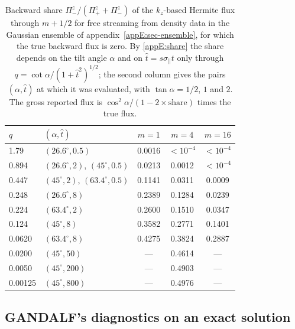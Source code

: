 \begin{table}[t]
  \centering
  \caption{Backward share $\Pi^z_-/(\Pi^z_++\Pi^z_-)$ of the $k_z$-based Hermite flux through $m+1/2$ for free streaming from density data in the Gaussian ensemble of appendix~\ref{appE:sec-ensemble}, for which the true backward flux is zero. By \eqref{appE:share} the share depends on the tilt angle $\alpha$ and on $\hat t=s\sigma_\parallel t$ only through $q=\cot\alpha/(1+\hat t^2)^{1/2}$; the second column gives the pairs $(\alpha,\hat t)$ at which it was evaluated, with $\tan\alpha=1/2$, $1$ and $2$. The gross reported flux is $\cos^2\alpha/(1-2\times\text{share})$ times the true flux.}
  \label{appE:tab}
  \small
  \begin{tabular}{@{}llccc@{}}
    \toprule
    $q$ & $(\alpha,\hat t)$ & $m=1$ & $m=4$ & $m=16$ \\
    \midrule
    1.79    & $(26.6^\circ,0.5)$                      & 0.0016 & $<10^{-4}$ & $<10^{-4}$ \\
    0.894   & $(26.6^\circ,2)$, $(45^\circ,0.5)$      & 0.0213 & 0.0012 & $<10^{-4}$ \\
    0.447   & $(45^\circ,2)$, $(63.4^\circ,0.5)$      & 0.1141 & 0.0311 & 0.0009 \\
    0.248   & $(26.6^\circ,8)$                        & 0.2389 & 0.1284 & 0.0239 \\
    0.224   & $(63.4^\circ,2)$                        & 0.2600 & 0.1510 & 0.0347 \\
    0.124   & $(45^\circ,8)$                          & 0.3582 & 0.2771 & 0.1401 \\
    0.0620  & $(63.4^\circ,8)$                        & 0.4275 & 0.3824 & 0.2887 \\
    0.0200  & $(45^\circ,50)$                         & ---    & 0.4614 & ---    \\
    0.0050  & $(45^\circ,200)$                        & ---    & 0.4903 & ---    \\
    0.00125 & $(45^\circ,800)$                        & ---    & 0.4976 & ---    \\
    \bottomrule
  \end{tabular}
\end{table}

\subsection{GANDALF's diagnostics on an exact solution}\label{appE:sec-gandalf}

